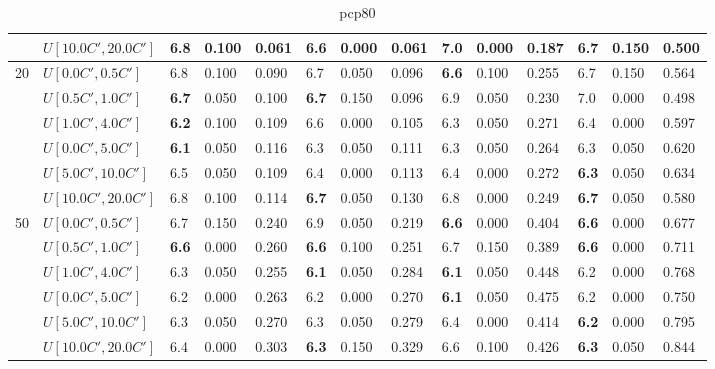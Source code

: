 \begin{table}[h]
{\begin{tabular}{|l|l||l|l|l||l|l|l||l|l|l||l|l|l|}
       & $U[10.0C',20.0C']$ & 6.8 & 0.100 & 0.061 & \textbf{6.6} & 0.000 & 0.061 & 7.0 & 0.000 & 0.187 & 6.7 & 0.150 & 0.500 \\
      \hline\hline
      \multirow{6}{*}{20} & $U[0.0C',0.5C']$ & 6.8 & 0.100 & 0.090 & 6.7 & 0.050 & 0.096 & \textbf{6.6} & 0.100 & 0.255 & 6.7 & 0.150 & 0.564 \\
       & $U[0.5C',1.0C']$ & \textbf{6.7} & 0.050 & 0.100 & \textbf{6.7} & 0.150 & 0.096 & 6.9 & 0.050 & 0.230 & 7.0 & 0.000 & 0.498 \\
       & $U[1.0C',4.0C']$ & \textbf{6.2} & 0.100 & 0.109 & 6.6 & 0.000 & 0.105 & 6.3 & 0.050 & 0.271 & 6.4 & 0.000 & 0.597 \\
       & $U[0.0C',5.0C']$ & \textbf{6.1} & 0.050 & 0.116 & 6.3 & 0.050 & 0.111 & 6.3 & 0.050 & 0.264 & 6.3 & 0.050 & 0.620 \\
       & $U[5.0C',10.0C']$ & 6.5 & 0.050 & 0.109 & 6.4 & 0.000 & 0.113 & 6.4 & 0.000 & 0.272 & \textbf{6.3} & 0.050 & 0.634 \\
       & $U[10.0C',20.0C']$ & 6.8 & 0.100 & 0.114 & \textbf{6.7} & 0.050 & 0.130 & 6.8 & 0.000 & 0.249 & \textbf{6.7} & 0.050 & 0.580 \\
      \hline\hline
      \multirow{6}{*}{50} & $U[0.0C',0.5C']$ & 6.7 & 0.150 & 0.240 & 6.9 & 0.050 & 0.219 & \textbf{6.6} & 0.000 & 0.404 & \textbf{6.6} & 0.000 & 0.677 \\
       & $U[0.5C',1.0C']$ & \textbf{6.6} & 0.000 & 0.260 & \textbf{6.6} & 0.100 & 0.251 & 6.7 & 0.150 & 0.389 & \textbf{6.6} & 0.000 & 0.711 \\
       & $U[1.0C',4.0C']$ & 6.3 & 0.050 & 0.255 & \textbf{6.1} & 0.050 & 0.284 & \textbf{6.1} & 0.050 & 0.448 & 6.2 & 0.000 & 0.768 \\
       & $U[0.0C',5.0C']$ & 6.2 & 0.000 & 0.263 & 6.2 & 0.000 & 0.270 & \textbf{6.1} & 0.050 & 0.475 & 6.2 & 0.000 & 0.750 \\
       & $U[5.0C',10.0C']$ & 6.3 & 0.050 & 0.270 & 6.3 & 0.050 & 0.279 & 6.4 & 0.000 & 0.414 & \textbf{6.2} & 0.000 & 0.795 \\
       & $U[10.0C',20.0C']$ & 6.4 & 0.000 & 0.303 & \textbf{6.3} & 0.150 & 0.329 & 6.6 & 0.100 & 0.426 & \textbf{6.3} & 0.050 & 0.844 \\
      \hline
      \end{tabular}
      }
      \caption{pcp80}
      \label{tab:pcp80}\end{table}


